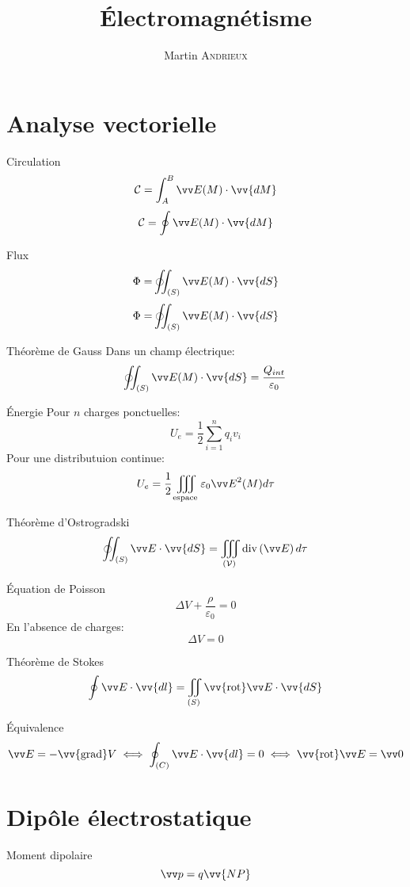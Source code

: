 \documentclass[french, a4paper, 11pt, twocolumn]{article}
\title{Électromagnétisme}
\author{Martin \textsc{Andrieux}}
\date{}
\newcommand{\inv}[1]{\dfrac{1}{#1}}
\newcommand{\po}{\left(}         %
\newcommand{\pf}{\right)}        %
\newcommand{\vect}[1]{\vv{#1}}
\newcommand{\grad}{\vect{\mathrm{grad}}}  %
\DeclareMathOperator{\diverg}{div}        %
\newcommand{\rota}{\vv{\mathrm{rot}}}    %
\newcommand{\ooint}{\ocircle\hspace{-3.65mm}\int\hspace{-2mm}\int}
\begin{document}
\maketitle

\section{Analyse vectorielle}
\begin{cadre}{Circulation}
  \[\mathcal C = \int_A^B \vv E(M)\cdot\vv{d M}\]
  \[\mathcal C = \oint \vv E(M)\cdot\vv{d M}\]
\end{cadre}

\begin{cadre}{Flux}
  \[\Phi = \ooint_{(S)} \vv E(M)\cdot\vv{d S}\]
  \[\Phi = \ooint_{(S)} \vv E(M)\cdot\vv{d S}\]
\end{cadre}

\begin{cadre}{Théorème de Gauss}
  Dans un champ électrique:
  \[\ooint_{(S)}\vv E(M)\cdot\vv{d S} = \dfrac{Q_{int}}{\varepsilon_{0}}\]
\end{cadre}

\begin{cadre}{Énergie}
  Pour $n$ charges ponctuelles:
  \[U_{e} = \dfrac{1}{2}\sum_{i=1}^n q_{i}v_{i}\]
  Pour une distributuion continue:
  \[U_{e} = \inv{2}\iiint_{\text{espace}}\varepsilon_{0}{\vv E}^{2}(M) d\tau\]
\end{cadre}

\begin{cadre}{Théorème d'Ostrogradski}
  \[\ooint_{(S)}\vv E \cdot \vv{d S} = \iiint_{(\mathcal V)} \diverg\po\vv E\pf d\tau\]
\end{cadre}

\begin{cadre}{Équation de Poisson}
  \[\Delta V + \dfrac{\rho}{\varepsilon_{0}} = 0\]
  En l'absence de charges:
  \[\Delta V = 0\]
\end{cadre}

\begin{cadre}{Théorème de Stokes}
  \[\oint \vv E\cdot\vv{d l} = \iint_{(S)}\rota \vv E \cdot \vv{d S}\]
\end{cadre}

\begin{cadre}{Équivalence}
  \[\vv E = -\grad V \iff \oint_{(C)}\vv E\cdot \vv{d l} = 0 \iff \rota\vv E = \vv0\]
\end{cadre}

\section{Dipôle électrostatique}
\begin{cadre}{Moment dipolaire}
  \[\vv p = q \vv{NP}\]
\end{cadre}
\end{document}
